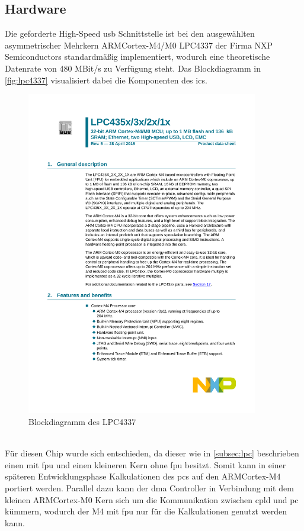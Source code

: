 \subsection{Hardware}
Die geforderte High-Speed \ac{usb} Schnittstelle ist bei den ausgewählten asymmetrischer Mehrkern ARM\SymbReg Cortex\SymbReg-M4/M0 LPC4337 der Firma NXP Semiconductors\cite{nxp_lpc4337} standardmäßig implementiert, wodurch eine theoretische Datenrate von 480 MBit/s zu Verfügung steht. Das Blockdiagramm in \autoref{fig:lpc4337} visualisiert dabei die Komponenten des \ac{ic}s.
\begin{figure}[h!]
	\centering
	\includegraphics[page=7,width=0.9\textwidth, trim=25mm 63mm 25mm 86mm, clip=true]{images/pcb/LPC435X_3X_2X_1X.PDF}%
	\caption[Blockdiagramm des LPC4337]{Blockdiagramm des LPC4337\cite[p. 20]{nxp_um10503}}
	\label{fig:lpc4337}
\end{figure}\\
Für diesen Chip wurde sich entschieden, da dieser wie in \autoref{subsec:lpc} beschrieben einen mit \ac{fpu} und einen kleineren Kern ohne \ac{fpu} besitzt. Somit kann in einer späteren Entwicklungsphase Kalkulationen des \ac{pc}s auf den ARM\SymbReg Cortex\SymbReg-M4 portiert werden. Parallel dazu kann der \ac{dma} Controller in Verbindung mit dem kleinen ARM\SymbReg Cortex\SymbReg-M0 Kern sich um die Kommunikation zwischen \ac{cpld} und \ac{pc} kümmern, wodurch der M4 mit \ac{fpu} nur für die Kalkulationen genutzt werden kann.\\
